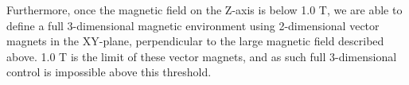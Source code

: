 		Furthermore, once the magnetic field on the Z-axis is below 1.0 T, we are able to define a full 3-dimensional magnetic environment using 2-dimensional vector magnets in the XY-plane, perpendicular to the large magnetic field described above. 1.0 T is the limit of these vector magnets, and as such full 3-dimensional control is impossible above this threshold.
		
	
